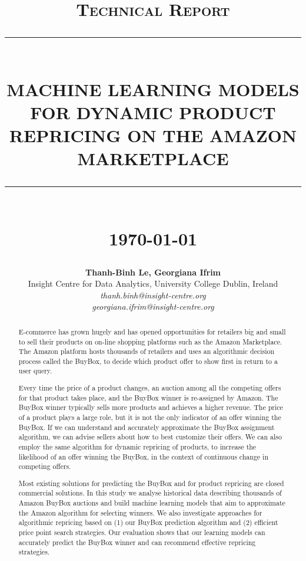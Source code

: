 \documentclass[12pt]{report}
\newcommand{\HRule}[1]{\rule{\linewidth}{#1}}
\begin{document}
	
	\title{ \normalsize \textsc{Technical Report}
		\\ [2.0cm]
		\HRule{0.5pt} \\
		\LARGE \textbf{\uppercase{Machine Learning Models for Dynamic Product Repricing on the Amazon Marketplace}}
		\HRule{2pt} \\ [0.5cm]
		\normalsize \today \vspace*{5\baselineskip}}
	
	\date{}
	
	\author{
		\textbf{Thanh-Binh Le, Georgiana Ifrim} \\ 
		Insight Centre for Data Analytics, University College Dublin, Ireland \\
		\textit{thanh.binh@insight-centre.org} \\ 
		\textit{georgiana.ifrim@insight-centre.org}
	}
	\maketitle
	
	\begin{abstract}	
		
		E-commerce has grown hugely and has opened opportunities for retailers big and small to sell their products on on-line shopping platforms such as the Amazon Marketplace. 
		The Amazon platform hosts thousands of retailers and uses an algorithmic decision process called the BuyBox, to decide which product offer to show first in return to a user query.
		
		Every time the price of a product changes, an auction among all the competing offers for that product takes place, and the BuyBox winner is re-assigned by Amazon. 
		The BuyBox winner typically sells more products and achieves a higher revenue. The price of a product plays a large role, but it is not the only indicator of an 
		offer winning the BuyBox. If we can understand and accurately approximate the BuyBox assignment algorithm, we can advise sellers about how to best customize their offers. 
		We can also employ the same algorithm for dynamic repricing of products, to increase the likelihood of an offer winning the BuyBox, in the context of continuous change in competing offers.
		
		Most existing solutions for predicting the BuyBox and for product repricing are closed commercial solutions. In this study we analyse historical data describing thousands 
		of Amazon BuyBox auctions  and build machine learning models that aim to approximate the Amazon algorithm for selecting winners. We also investigate approaches for algorithmic 
		repricing based on (1) our BuyBox prediction algorithm and (2) efficient price point search strategies. Our evaluation shows that our learning models can accurately predict the 
		BuyBox winner and can recommend effective repricing strategies.
		
		
	\end{abstract}
	
\end{document}
